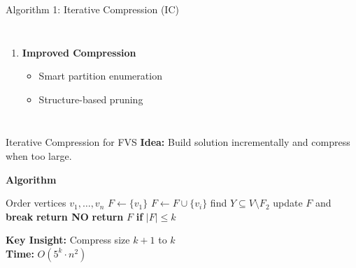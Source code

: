 \documentclass[aspectratio=169]{beamer}
\begin{document}
\begin{frame}{Algorithm 1: Iterative Compression (IC)}
\begin{columns}[T]
\begin{enumerate}
			\item \textbf{Improved Compression}
			      \begin{itemize}
				      \scriptsize
				      \item Smart partition enumeration
				      \item Structure-based pruning
			      \end{itemize}
		\end{enumerate}

	\end{columns}
\end{frame}

\begin{frame}{Iterative Compression for FVS}
	\small
	\textbf{Idea:} Build solution incrementally and compress when too large.

	\textbf{Algorithm}
	{\small
		\setlength{\baselineskip}{8pt}
		\begin{algorithmic}[1]
			\State Order vertices $v_1,\dots,v_n$
			\State $F \gets \{v_1\}$
			\State $F \gets F \cup \{v_i\}$
			\State find $Y \subseteq V \setminus F_2$
			\State update $F$ and \textbf{break}
			\EndIf
			\EndFor
			\State \textbf{return NO}
			\EndIf
			\EndIf
			\EndFor
			\State \textbf{return} $F$ \textbf{if} $|F| \le k$
		\end{algorithmic}
	}


	\textbf{Key Insight:} Compress size $k\!+\!1$ to $k$ \\
	\textbf{Time:} $O(5^k \cdot n^2)$
\end{frame}
\end{document}
